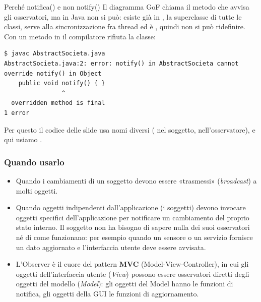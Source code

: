 \begin{warningbox}{{Perché notifica() e non notify()}}
  Il diagramma GoF chiama  il metodo che avvisa gli osservatori, ma in Java non si può: 
  esiste già in , la superclasse di tutte le classi, serve alla sincronizzazione fra thread ed è
  , quindi non si può ridefinire. Con un metodo  in  il
  compilatore rifiuta la classe:
  \begin{lstlisting}[style=shell, name=Terminale]
$ javac AbstractSocieta.java
AbstractSocieta.java:2: error: notify() in AbstractSocieta cannot override notify() in Object
    public void notify() { }
                ^
  overridden method is final
1 error
\end{lstlisting}
  Per questo il codice delle slide usa nomi diversi ( nel soggetto,  nell'osservatore), e
  qui usiamo .
\end{warningbox}

\subsubsection*{Quando usarlo}

\begin{itemize}
  \item Quando i cambiamenti di un soggetto devono essere «trasmessi» (\textit{broadcast}) a molti oggetti.
  \item Quando oggetti indipendenti dall'applicazione (i soggetti) devono invocare oggetti specifici dell'applicazione per
        notificare un cambiamento del proprio stato interno. Il soggetto non ha bisogno di sapere nulla dei suoi osservatori
        né di come funzionano: per esempio quando un sensore o un servizio fornisce un dato aggiornato e l'interfaccia
        utente deve essere avvisata.
  \item L'Observer è il cuore del pattern \textbf{MVC} (Model-View-Controller), in cui gli oggetti dell'interfaccia utente
        (\textit{View}) possono essere osservatori diretti degli oggetti del modello (\textit{Model}): gli oggetti del
        Model hanno le funzioni di notifica, gli oggetti della GUI le funzioni di aggiornamento.
\end{itemize}

